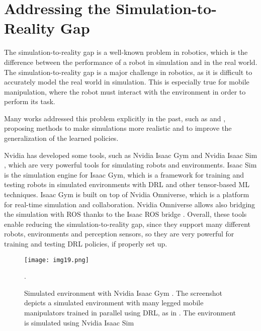 \onehalfspacing


\section{Addressing the Simulation-to-Reality Gap}

The simulation-to-reality gap is a well-known problem in robotics, which is the difference
between the performance of a robot in simulation and in the real world. The simulation-to-reality
gap is a major challenge in robotics, as it is difficult to accurately model the real world
in simulation. This is especially true for mobile manipulation, where the robot must interact
with the environment in order to perform its task. 

Many works addressed this problem explicitly in the past, such as \cite{liu2021deep} and 
\cite{zhang2021simtoreal}, proposing methods to make simulations more realistic and
to improve the generalization of the learned policies.

Nvidia has developed some tools, such as Nvidia Isaac Gym \cite{isaacgym} and Nvidia Isaac Sim
\cite{isaacsim}, which are very powerful tools for simulating robots and environments.
Isaac Sim is the simulation engine for Isaac Gym, which is a framework for training and
testing robots in simulated environments with DRL and other tensor-based ML techniques. 
Isaac Gym is built on top of Nvidia Omniverse, which is a platform for real-time
simulation and collaboration. Nvidia Omniverse allows also bridging the simulation with ROS
thanks to the Isaac ROS bridge \cite{isaacros}. Overall, these tools enable reducing the
simulation-to-reality gap, since they support many different robots, environments and perception
sensors, so they are very powerful for training and testing DRL policies, if properly set up.

\begin{figure}[H]
	\centering
	\texttt{[image: img19.png]}
	\captionsetup{width=1\linewidth}
	\caption{Simulated environment with Nvidia Isaac Gym \cite{isaacros}.
	The screenshot depicts a simulated environment with many legged mobile manipulators trained in
	parallel using DRL, as in \cite{mittal2022articulated}. 
	The environment is simulated using Nvidia Isaac Sim \cite{isaacsim}}.
	\label{fig:img19}
\end{figure}


